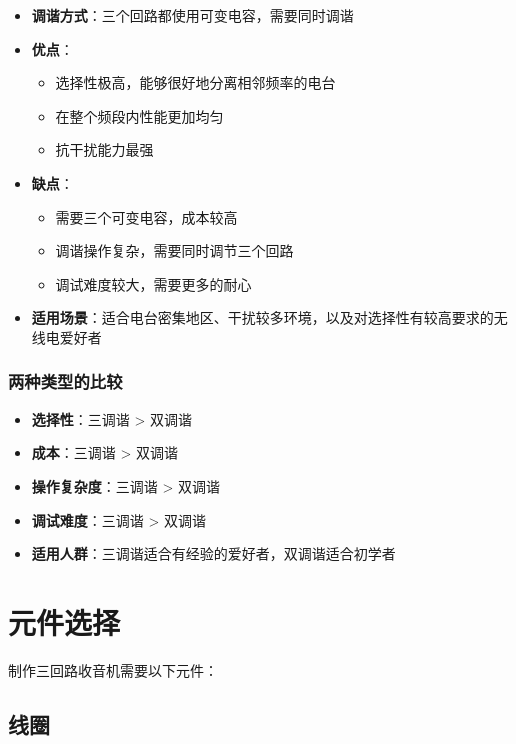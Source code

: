 \documentclass[12pt,UTF8]{ctexbook}
\begin{document}
\begin{itemize}[leftmargin=3.5em]
    \item \textbf{调谐方式}：三个回路都使用可变电容，需要同时调谐
    \item \textbf{优点}：
        \begin{itemize}[leftmargin=3.5em]
        \item 选择性极高，能够很好地分离相邻频率的电台
        \item 在整个频段内性能更加均匀
        \item 抗干扰能力最强
        \end{itemize}
    \item \textbf{缺点}：
        \begin{itemize}[leftmargin=3.5em]
        \item 需要三个可变电容，成本较高
        \item 调谐操作复杂，需要同时调节三个回路
        \item 调试难度较大，需要更多的耐心
        \end{itemize}
    \item \textbf{适用场景}：适合电台密集地区、干扰较多环境，以及对选择性有较高要求的无线电爱好者
\end{itemize}

\subsubsection{两种类型的比较}

\begin{itemize}[leftmargin=3.5em]
    \item \textbf{选择性}：三调谐 > 双调谐
    \item \textbf{成本}：三调谐 > 双调谐
    \item \textbf{操作复杂度}：三调谐 > 双调谐
    \item \textbf{调试难度}：三调谐 > 双调谐
    \item \textbf{适用人群}：三调谐适合有经验的爱好者，双调谐适合初学者
\end{itemize}

\section{元件选择}

制作三回路收音机需要以下元件：

\subsection{线圈}
\end{document}
